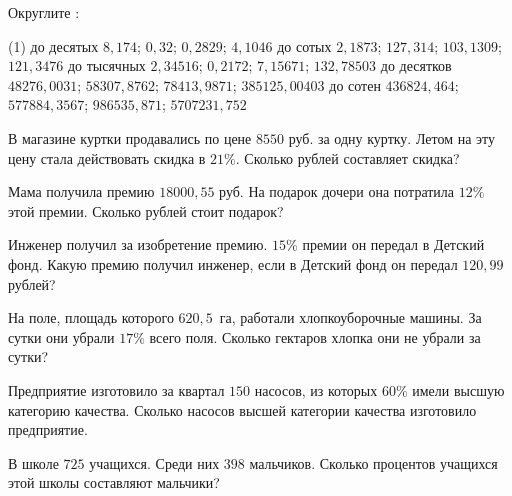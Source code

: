 %
%

\begin{class}[number=1]
	\begin{listofex}
		\item  Округлите :
		\begin{tasks}(1)
			\task до десятых \( 8,174 \); \( 0,32 \); \(  0,2829 \); \( 4,1046 \)
			\task до сотых \( 2,1873 \); \( 127,314 \); \( 103,1309 \);  \( 121,3476 \)
			\task до тысячных \( 2,34516 \); \( 0,2172 \);  \( 7,15671 \); \( 132,78503 \)
			\task до десятков \( 48276,0031 \); \( 58307,8762 \);  \( 78413,9871 \); \( 385125,00403 \)
			\task до сотен \( 436824,464 \); \( 577884,3567 \);  \( 986535,871 \); \( 5707231,752 \)
		\end{tasks}
		\item В магазине куртки продавались по цене \( 8550 \) руб. за одну куртку. Летом на эту цену стала действовать скидка в \( 21\% \). Сколько рублей составляет скидка?
		\item Мама получила премию \( 18000,55 \) руб. На подарок дочери она потратила \( 12\% \) этой премии. Сколько рублей стоит подарок?
		\item Инженер получил за изобретение премию. \( 15\% \) премии он передал в Детский фонд. Какую премию получил инженер, если в Детский фонд он передал \( 120,99 \) рублей?
		\item На поле, площадь которого \( 620,5 \)  га, работали хлопкоуборочные машины. За сутки они убрали \( 17\% \) всего поля. Сколько гектаров хлопка они не убрали за сутки?
		\item Предприятие изготовило за квартал \( 150 \) насосов, из которых \( 60\% \) имели высшую категорию качества. Сколько насосов высшей категории качества изготовило предприятие.
		\item В школе \( 725 \) учащихся. Среди них \( 398 \) мальчиков. Сколько процентов учащихся этой школы составляют мальчики?
	\end{listofex}
\end{class}

